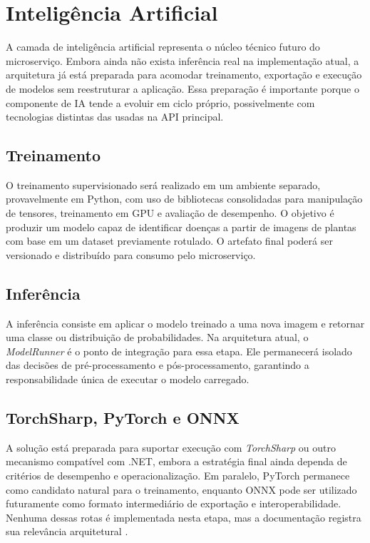 \chapter{Inteligência Artificial}

A camada de inteligência artificial representa o núcleo técnico futuro do microserviço. Embora ainda não exista inferência real na implementação atual, a arquitetura já está preparada para acomodar treinamento, exportação e execução de modelos sem reestruturar a aplicação. Essa preparação é importante porque o componente de IA tende a evoluir em ciclo próprio, possivelmente com tecnologias distintas das usadas na API principal.

\section{Treinamento}

O treinamento supervisionado será realizado em um ambiente separado, provavelmente em Python, com uso de bibliotecas consolidadas para manipulação de tensores, treinamento em GPU e avaliação de desempenho. O objetivo é produzir um modelo capaz de identificar doenças a partir de imagens de plantas com base em um dataset previamente rotulado. O artefato final poderá ser versionado e distribuído para consumo pelo microserviço.

\section{Inferência}

A inferência consiste em aplicar o modelo treinado a uma nova imagem e retornar uma classe ou distribuição de probabilidades. Na arquitetura atual, o \textit{ModelRunner} é o ponto de integração para essa etapa. Ele permanecerá isolado das decisões de pré-processamento e pós-processamento, garantindo a responsabilidade única de executar o modelo carregado.

\section{TorchSharp, PyTorch e ONNX}

A solução está preparada para suportar execução com \textit{TorchSharp} ou outro mecanismo compatível com .NET, embora a estratégia final ainda dependa de critérios de desempenho e operacionalização. Em paralelo, PyTorch permanece como candidato natural para o treinamento, enquanto ONNX pode ser utilizado futuramente como formato intermediário de exportação e interoperabilidade. Nenhuma dessas rotas é implementada nesta etapa, mas a documentação registra sua relevância arquitetural \cite{pytorchdocs,torchsharpdocs}.

